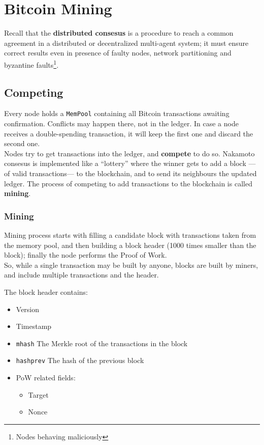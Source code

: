 \chapter{Bitcoin Mining}

Recall that the \textbf{distributed consesus} is a procedure to reach a common agreement in a distributed or decentralized multi-agent system;
it must ensure correct results even in presence of faulty nodes, network partitioning and byzantine faults\footnote{Nodes behaving maliciously}.

\section{Competing}
Every node holds a \texttt{MemPool} containing all Bitcoin transactions awaiting confirmation.
Conflicts may happen there, not in the ledger.
In case a node receives a double-spending transaction, it will keep the first one and discard the second one.\\
Nodes try to get transactions into the ledger, and \textbf{compete} to do so.
Nakamoto consesus is implemented like a ``lottery'' where the winner gets to add a block ---of valid transactions--- to the blockchain, and to send its neighbours the updated ledger. The process of competing to add transactions to the blockchain is called \textbf{mining}.

\subsection{Mining}
Mining process starts with filling a candidate block with transactions taken
from the memory pool, and then building a block header (1000 times smaller than the block);
finally the node performs the Proof of Work.\\
So, while a single transaction may be built by anyone, blocks are built by miners, and include multiple transactions and the header.

The block header contains:
\begin{itemize}
   \item Version
   \item Timestamp
   \item \texttt{mhash} The Merkle root of the transactions in the block
   \item \texttt{hashprev} The hash of the previous block
   \item PoW related fields:
   \begin{itemize}
      \item Target
      \item Nonce
   \end{itemize}
\end{itemize}

